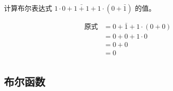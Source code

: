 \begin{collections}
    \begin{example}
        计算布尔表达式 $1 \cdot 0 + \bar{1 + 1} + 1 \cdot (0 + \bar{1})$ 的值。
    \end{example}

    \begin{solution}
        \begin{equation*}
            \begin{aligned}
                \text{原式} &= 0 + \bar{1} + 1 \cdot (0 + 0) \\
                &= 0 + 0 + 1 \cdot 0 \\
                &= 0 + 0 \\
                &= 0 \\
            \end{aligned}
        \end{equation*}
    \end{solution}
\end{collections}

\subsection{布尔函数}
